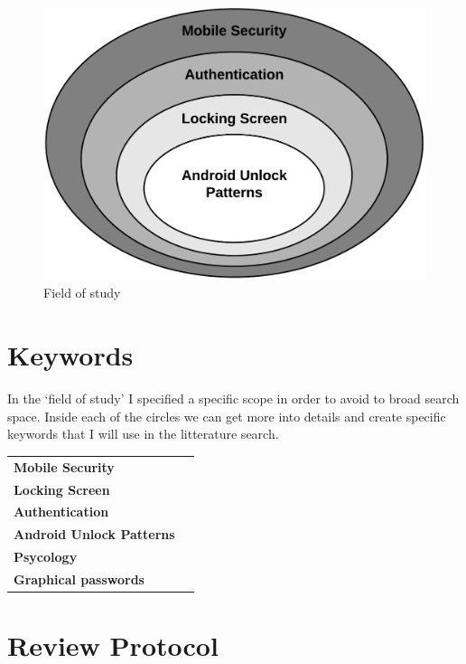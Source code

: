     \begin{figure}[H]
    \centering
    \includegraphics[scale=0.25]{pics/Fieldofstudy.png}
    \caption{Field of study}
    \end{figure}

    \section*{Keywords}  
    In the `field of study' I specified a specific scope in order to avoid to broad search space. 
    Inside each of the circles we can get more into details and create specific keywords that I will use in 
     the litterature search. 

    \begin{tabular}{ || l | l ||}
      \hline
      {\bf Mobile Security} & \\
      {\bf Locking Screen} &  \\
      {\bf Authentication} &  \\
      {\bf Android Unlock Patterns} & \\ 
      {\bf Psycology} & \\
      {\bf Graphical passwords} & \\
      \hline
    \end{tabular}
    \section*{Review Protocol}
